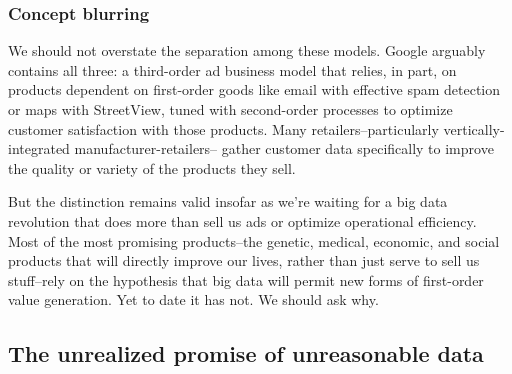 \documentclass[12pt]{article}
\begin{document}
\subsubsection{Concept blurring}
\label{sec:concept-blurring}

We should not overstate the separation among these models. Google
arguably contains all three: a third-order ad business model that
relies, in part, on products dependent on first-order goods like email
with effective spam detection or maps with StreetView, tuned with
second-order processes to optimize customer satisfaction with those
products. Many retailers--particularly vertically-integrated
manufacturer-retailers-- gather customer data specifically to improve
the quality or variety of the products they sell.

But the distinction remains valid insofar as we're waiting for a big
data revolution that does more than sell us ads or optimize
operational efficiency. Most of the most promising products--the
genetic, medical, economic, and social products that will directly
improve our lives, rather than just serve to sell us stuff--rely on
the hypothesis that big data will permit new forms of first-order
value generation. Yet to date it has not. We should ask why. 

\subsection{The unrealized promise of unreasonable data}
\label{sec:unre-prom-unre}
\end{document}
